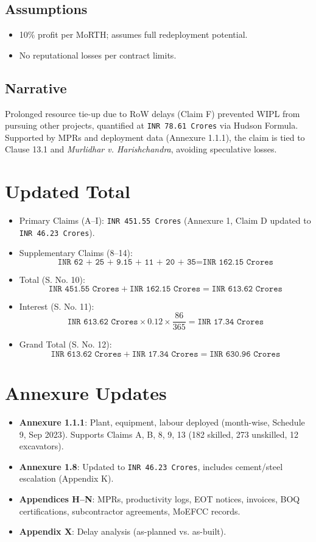 \documentclass[12pt,letterpaper]{article}
\begin{document}
	\subsection*{Assumptions}
	\begin{itemize}
		\item 10\% profit per MoRTH; assumes full redeployment potential.
		\item No reputational losses per contract limits.
	\end{itemize}
	
	\subsection*{Narrative}
	Prolonged resource tie-up due to RoW delays (Claim F) prevented WIPL from pursuing other projects, quantified at \texttt{INR 78.61 Crores} via Hudson Formula. Supported by MPRs and deployment data (Annexure 1.1.1), the claim is tied to Clause 13.1 and \textit{Murlidhar v. Harishchandra}, avoiding speculative losses.
	
	\section*{Updated Total}
	\begin{itemize}
		\item Primary Claims (A--I): \texttt{INR 451.55 Crores} (Annexure 1, Claim D updated to \texttt{INR 46.23 Crores}).
		\item Supplementary Claims (8--14):
		\[
		\texttt{INR 62 + 25 + 9.15 + 11 + 20 + 35} = \texttt{INR 162.15 Crores}
		\]
		\item Total (S. No. 10):
		\[
		\texttt{INR 451.55 Crores} + \texttt{INR 162.15 Crores} = \texttt{INR 613.62 Crores}
		\]
		\item Interest (S. No. 11):
		\[
		\texttt{INR 613.62 Crores} \times 0.12 \times \frac{86}{365} = \texttt{INR 17.34 Crores}
		\]
		\item Grand Total (S. No. 12):
		\[
		\texttt{INR 613.62 Crores} + \texttt{INR 17.34 Crores} = \texttt{INR 630.96 Crores}
		\]
	\end{itemize}
	
	\section*{Annexure Updates}
	\begin{itemize}
		\item \textbf{Annexure 1.1.1}: Plant, equipment, labour deployed (month-wise, Schedule 9, Sep 2023). Supports Claims A, B, 8, 9, 13 (182 skilled, 273 unskilled, 12 excavators).
		\item \textbf{Annexure 1.8}: Updated to \texttt{INR 46.23 Crores}, includes cement/steel escalation (Appendix K).
		\item \textbf{Appendices H--N}: MPRs, productivity logs, EOT notices, invoices, BOQ certifications, subcontractor agreements, MoEFCC records.
		\item \textbf{Appendix X}: Delay analysis (as-planned vs. as-built).
	\end{itemize}
	
\end{document}
